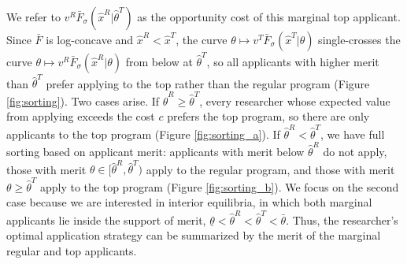 \documentclass[12pt,reqno]{amsart}
\theoremstyle{definition}
\theoremstyle{plain} %
\begin{document}
We refer to $v^R\bar{F}_{\sigma}(\hat{x}^R|\hat{\theta}^T)$ as the opportunity cost of this marginal top applicant. Since $\bar{F}$ is log-concave and $\hat{x}^R<\hat{x}^T$, the curve $\theta\mapsto v^T\bar{F}_{\sigma}(\hat{x}^T|\theta)$ single-crosses the curve $\theta\mapsto v^R\bar{F}_{\sigma}(\hat{x}^R|\theta)$ from below at $\hat{\theta}^T$, so all applicants with higher merit than $\hat{\theta}^T$ prefer applying to the top rather than the regular program (Figure \ref{fig:sorting}). Two cases arise. If $\hat{\theta}^R\geq \hat{\theta}^T$, every researcher whose expected value from applying exceeds the cost $c$ prefers the top program, so there are only applicants to the top program (Figure \ref{fig:sorting_a}). If $\hat{\theta}^R < \hat{\theta}^T$, we have full sorting based on applicant merit: applicants with merit below $\hat{\theta}^R$ do not apply, those with merit $\theta\in [\hat{\theta}^R, \hat{\theta}^T)$ apply to the regular program, and those with merit $\theta\geq \hat{\theta}^T$ apply to the top program (Figure \ref{fig:sorting_b}). We focus on the second case because we are interested in interior equilibria, in which both marginal applicants lie inside the support of merit, $\underline{\theta}<\hat{\theta}^R<\hat{\theta}^T<\bar{\theta}$. Thus, the researcher's optimal application strategy can be summarized by the merit of the marginal regular and top applicants.
\end{document}
